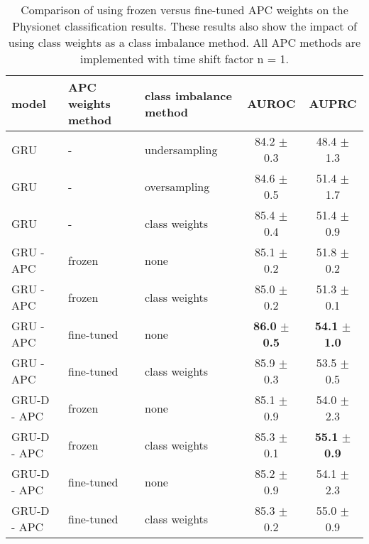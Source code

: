 \documentclass{article}
\begin{document}
\vspace{0.5cm}

\begin{table}[h]
\caption{Comparison of using frozen versus fine-tuned APC weights on the Physionet classification results. 
These results also show the impact of using class weights as a class imbalance method.
All APC methods are implemented with time shift factor n = 1.}
\vskip 0.1in
\begin{center}
\begin{small}
\begin{sc}
\begin{tabular}{lllcc}
\toprule
model & APC weights method & class imbalance method & AUROC & AUPRC \\
\midrule
GRU & - & undersampling & 84.2 $\pm$ 0.3 & 48.4 $\pm$ 1.3\\ 
\hline 
GRU & - & oversampling & 84.6 $\pm$ 0.5 & 51.4 $\pm$ 1.7 \\
\hline 
GRU & - & class weights & 85.4 $\pm$ 0.4 & 51.4 $\pm$ 0.9\\ 
\hhline{=====}
GRU - APC  & frozen & none &  85.1 $\pm$ 0.2 &  51.8 $\pm$ 0.2\\ 
\hline 
GRU - APC & frozen & class weights &  85.0 $\pm$ 0.2 & 51.3 $\pm$ 0.1 \\
\hline 
GRU - APC  & fine-tuned & none & \textbf{86.0} $\pm$ \textbf{0.5} & \textbf{54.1} $\pm$ \textbf{1.0}\\ 
\hline 
GRU - APC & fine-tuned & class weights & 85.9 $\pm$ 0.3 & 53.5 $\pm$ 0.5\\ 
\hhline{=====}
GRU-D - APC & frozen & none & 85.1 $\pm$ 0.9 & 54.0 $\pm$ 2.3\\ 
\hline 
GRU-D - APC & frozen & class weights &  85.3 $\pm$ 0.1 & \textbf{55.1} $\pm$ \textbf{0.9}\\ 
\hline 
GRU-D - APC & fine-tuned & none & 85.2 $\pm$ 0.9  & 54.1 $\pm$ 2.3\\ 
\hline 
GRU-D - APC & fine-tuned & class weights & 85.3 $\pm$ 0.2 & 55.0 $\pm$ 0.9\\
\bottomrule
\end{tabular}
\end{sc}
\end{small}
\end{center}
\vskip -0.15in
\end{table}
\end{document}
